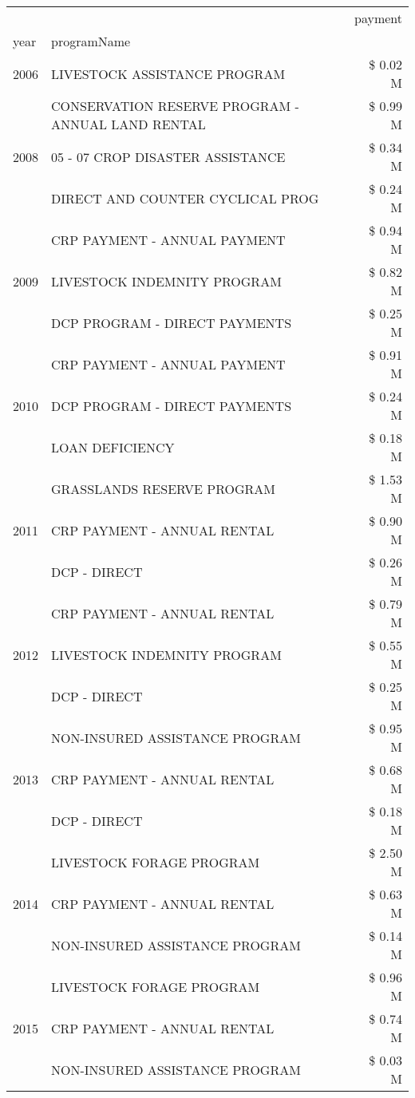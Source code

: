 \begin{tabular}{llr}
\toprule
 &  & payment \\
year & programName &  \\
\midrule
2006 & LIVESTOCK ASSISTANCE PROGRAM & \$ 0.02 M \\
\cline{1-3}
\multirow[t]{3}{*}{2008} & CONSERVATION RESERVE PROGRAM - ANNUAL LAND RENTAL & \$ 0.99 M \\
 & 05 - 07 CROP DISASTER ASSISTANCE & \$ 0.34 M \\
 & DIRECT AND COUNTER CYCLICAL PROG & \$ 0.24 M \\
\cline{1-3}
\multirow[t]{3}{*}{2009} & CRP PAYMENT - ANNUAL PAYMENT & \$ 0.94 M \\
 & LIVESTOCK INDEMNITY PROGRAM & \$ 0.82 M \\
 & DCP PROGRAM - DIRECT PAYMENTS & \$ 0.25 M \\
\cline{1-3}
\multirow[t]{3}{*}{2010} & CRP PAYMENT - ANNUAL PAYMENT & \$ 0.91 M \\
 & DCP PROGRAM - DIRECT PAYMENTS & \$ 0.24 M \\
 & LOAN DEFICIENCY & \$ 0.18 M \\
\cline{1-3}
\multirow[t]{3}{*}{2011} & GRASSLANDS RESERVE PROGRAM & \$ 1.53 M \\
 & CRP PAYMENT - ANNUAL RENTAL & \$ 0.90 M \\
 & DCP - DIRECT & \$ 0.26 M \\
\cline{1-3}
\multirow[t]{3}{*}{2012} & CRP PAYMENT - ANNUAL RENTAL & \$ 0.79 M \\
 & LIVESTOCK INDEMNITY PROGRAM & \$ 0.55 M \\
 & DCP - DIRECT & \$ 0.25 M \\
\cline{1-3}
\multirow[t]{3}{*}{2013} & NON-INSURED ASSISTANCE PROGRAM & \$ 0.95 M \\
 & CRP PAYMENT - ANNUAL RENTAL & \$ 0.68 M \\
 & DCP - DIRECT & \$ 0.18 M \\
\cline{1-3}
\multirow[t]{3}{*}{2014} & LIVESTOCK FORAGE PROGRAM & \$ 2.50 M \\
 & CRP PAYMENT - ANNUAL RENTAL & \$ 0.63 M \\
 & NON-INSURED ASSISTANCE PROGRAM & \$ 0.14 M \\
\cline{1-3}
\multirow[t]{3}{*}{2015} & LIVESTOCK FORAGE PROGRAM & \$ 0.96 M \\
 & CRP PAYMENT - ANNUAL RENTAL & \$ 0.74 M \\
 & NON-INSURED ASSISTANCE PROGRAM & \$ 0.03 M \\

\end{tabular}
